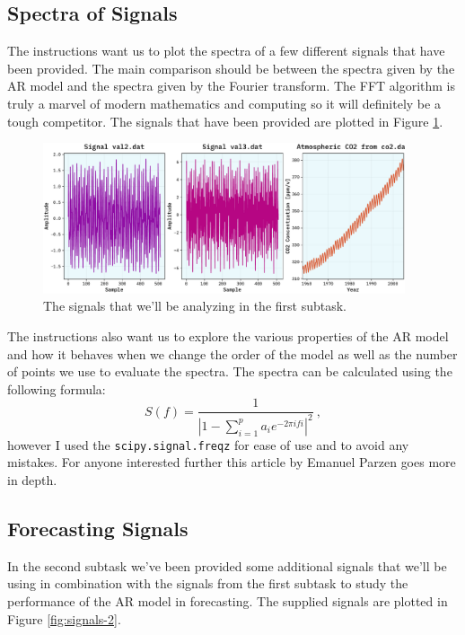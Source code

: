 \documentclass[10pt, titlepage, a4paper]{article}
\begin{document}
\subsection{Spectra of Signals}
The instructions want us to plot the spectra of a few different signals that have been provided. The main comparison 
should be between the spectra given by the AR model and the spectra given by the Fourier transform. The FFT algorithm 
is truly a marvel of modern mathematics and computing so it will definitely be a tough competitor. The signals that have 
been provided are plotted in Figure \ref{fig:signals}.

\begin{figure}[H]
    \centering
    \includegraphics[width=0.95\textwidth]{../MaxEntropy/Images/supplied-data.pdf}
    \caption{The signals that we'll be analyzing in the first subtask.}
    \label{fig:signals}
\end{figure}

The instructions also want us to explore the various properties of the AR model and how it behaves when we change the
order of the model as well as the number of points we use to evaluate the spectra. The spectra can be calculated 
using the following formula:
%
\begin{equation}
    S(f) = \frac{1}{|1 - \sum_{i=1}^p a_i e^{-2\pi i f i}|^2}\>,
\end{equation}
%
however I used the \texttt{scipy.signal.freqz} for ease of use and to avoid any mistakes. For anyone interested further 
this article by Emanuel Parzen \cite{parzen} goes more in depth. 

\subsection{Forecasting Signals}
In the second subtask we've been provided some additional signals that we'll be using in combination with the signals from 
the first subtask to study the performance of the AR model in forecasting. The supplied signals are plotted in Figure 
\ref{fig:signals-2}.
\end{document}
